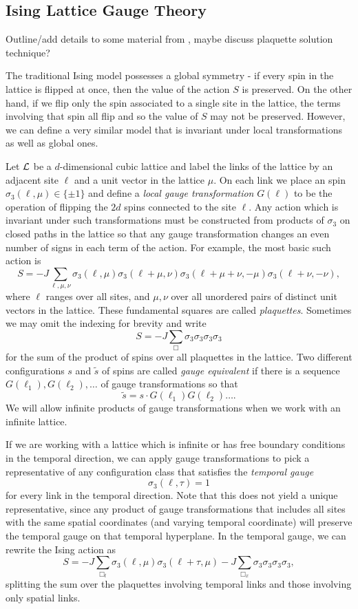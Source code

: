 \documentclass[11pt,reqno]{amsart}
\begin{document}
	\subsection{Ising Lattice Gauge Theory}
	
	Outline/add details to some material from \cite{KogutGaugeSummary}, maybe discuss \cite{MuellerJohnstonJanke17} plaquette solution technique?
	
	The traditional Ising model possesses a global symmetry - if every spin in the lattice is flipped at once, then the value of the action $S$ is preserved.
	On the other hand, if we flip only the spin associated to a single site in the lattice, the terms involving that spin all flip and so the value of $S$ may not be preserved.
	However, we can define a very similar model that is invariant under local transformations as well as global ones.
	
	Let $\mathcal{L}$ be a $d$-dimensional cubic lattice and label the links of the lattice by an adjacent site $\ell$ and a unit vector in the lattice $\mu$. 
	On each link we place an spin $\sigma_3(\ell,\mu)\in \{\pm 1\}$ and define a \emph{local gauge transformation} $G(\ell)$ to be the operation of flipping the $2d$ spins connected to the site $\ell$.
	Any action which is invariant under such transformations must be constructed from products of $\sigma_3$ on closed paths in the lattice so that any gauge transformation changes an even number of signs in each term of the action.
	For example, the most basic such action is 
		\[S=-J\sum_{\ell,\mu,\nu}\sigma_3(\ell,\mu)\sigma_3(\ell+\mu,\nu)\sigma_3(\ell+\mu+\nu,-\mu)\sigma_3(\ell+\nu,-\nu), \]
	where $\ell$ ranges over all sites, and $\mu,\nu$ over all unordered pairs of distinct unit vectors in the lattice.
	These fundamental squares are called \emph{plaquettes}.
	Sometimes we may omit the indexing for brevity and write
		\[S=-J\sum_{\Box} \sigma_3\sigma_3\sigma_3\sigma_3 \]
	for the sum of the product of spins over all plaquettes in the lattice. 
	Two different configurations $s$ and $\tilde{s}$ of spins are called \emph{gauge equivalent} if there is a sequence $G(\ell_1),G(\ell_2),\ldots$ of gauge transformations so that 
		\[ \tilde{s}=s\cdot G(\ell_1)G(\ell_2)\ldots. \]
	We will allow infinite products of gauge transformations when we work with an infinite lattice.
	
	If we are working with a lattice which is infinite or has free boundary conditions in the temporal direction, we can apply gauge transformations to pick a representative of any configuration class that satisfies the \emph{temporal gauge}
		\[ \sigma_3(\ell, \tau) =1 \]
	for every link in the temporal direction.	
	Note that this does not yield a unique representative, since any product of gauge transformations that includes all sites with the same spatial coordinates (and varying temporal coordinate) will preserve the temporal gauge on that temporal hyperplane.
	In the temporal gauge, we can rewrite the Ising action as
		\[S = -J\sum_{\Box_t} \sigma_3(\ell,\mu)\sigma_3(\ell+\tau,\mu) -J\sum_{\Box_x} \sigma_3\sigma_3\sigma_3\sigma_3,\]
	splitting the sum over the plaquettes involving temporal links and those involving only spatial links.\\
	
\end{document}
